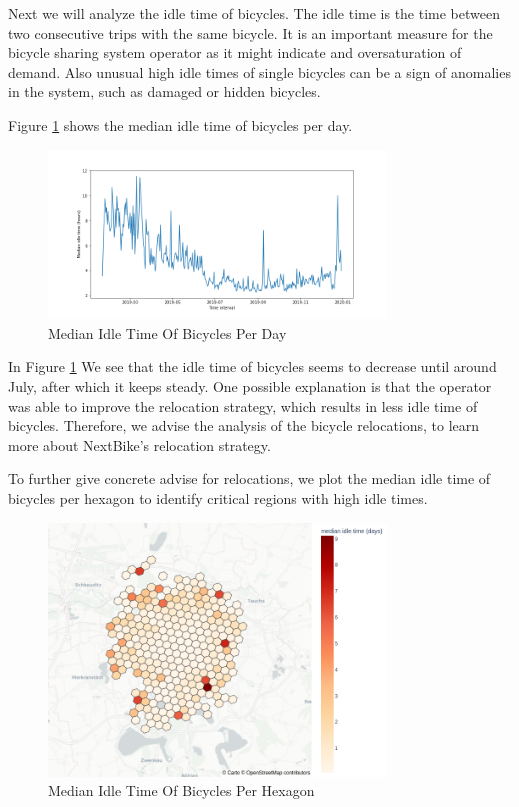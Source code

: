 Next we will analyze the idle time of bicycles. The idle time is the time
between two consecutive trips with the same bicycle. It is an important measure
for the bicycle sharing system operator as it might indicate and oversaturation
of demand. Also unusual high idle times of single bicycles can be a sign of
anomalies in the system, such as damaged or hidden bicycles.


Figure \ref{fig:descriptive_analysis_idle_time_daily} shows the median idle time of bicycles per day.
\begin{figure}[htb]
    \centering
    \includegraphics[width=0.8\textwidth]{Figures/descriptive_analysis/idle_time_daily.png}
    \caption{Median Idle Time Of Bicycles Per Day}
    \label{fig:descriptive_analysis_idle_time_daily}
\end{figure}

In Figure \ref{fig:descriptive_analysis_idle_time_daily} We see that the idle time of bicycles seems to decrease until around July, after which it keeps steady.
One possible explanation is that the operator was able to improve the relocation
strategy, which results in less idle time of bicycles.
Therefore, we advise the analysis of the bicycle relocations, to learn more about
NextBike's relocation strategy.

To further give concrete advise for relocations, we plot the median idle time
of bicycles per hexagon to identify critical regions with high idle times.

\begin{figure}[htb]
    \centering
    \includegraphics[width=0.8\textwidth]{Figures/descriptive_analysis/ide_time_hexagon.png}
    \caption{Median Idle Time Of Bicycles Per Hexagon}
    \label{fig:descriptive_analysis_idle_time_hexagon}
\end{figure}

